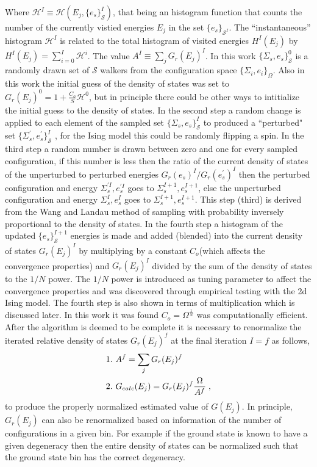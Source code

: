\documentclass[aps,pre,reprint,superscriptaddress,showkeys]{revtex4-1}
\begin{document}
Where  $\mathcal{H}^I \equiv \mathcal{H}(E_j,\{e_s\}_{\mathcal{S}}^I)$, that being an  histogram function that counts the number of the currently vistied  energies $E_j$ in the set $\{e_s\}_{\mathcal{S}^I}$. The ``instantaneous'' histogram $\mathcal{H}^I$ is related to the total histogram of visited energies $H^I(E_j)$ by $H^I(E_j) = \sum_{i=0}^{I}\mathcal{H}^i$. The value $A^I \equiv \sum_jG_r(E_j)^I$.  In this work $\{\Sigma_{s},e_s\}_{\mathcal{S}}^0$  is a randomly drawn set of $\mathcal{S}$ walkers from the configuration space $\{ \Sigma_i, e_i \}_\Omega $. Also in this work the initial guess of the density of states was set to $G_{r}(E_j)^0 = 1 +  \frac{C_o}{S}\mathcal{H}^0$, but in principle there could be other ways to intitialize the initial guess to the density of states. In the second step  a random change is applied to each element of the sampled set $\{\Sigma_{s},e_s\}_{\mathcal{S}}^I$ to produced a ``perturbed" set $ \{\Sigma_{s}^{'},e_s^{'}\}_{\mathcal{S}}^I$ , for the Ising model this could be randomly flipping a spin.  In the third step a random number is drawn between zero and one for every sampled configuration, if this number is less then the ratio of the current density of states of the unperturbed to perturbed energies $G_{r}(e_s)^{I}/G_{r}(e_s^{'})^{I}$ then the perturbed configuration and energy  $\Sigma_{s}^{'I},e_s^{'I}$  goes to $\Sigma_{s}^{I+1},e_s^{I+1}$,  else the unperturbed configuration and energy $\Sigma_{s}^{I},e_s^I$  goes to $\Sigma_{s}^{I+1},e_s^{I+1}$. This step (third) is derived from the Wang and Landau method of sampling with probability inversely proportional to the density of states.  In the fourth step a histogram of the updated $\{ e_s \}^{I+1}_{\mathcal{S}}$ energies is made and added (blended) into the current density of states $G_{r}(E_j)^I$   by multiplying  by a constant $C_{o}$(which affects the convergence properties) and   $G_{r}(E_j)^{I}$ divided by the sum of the density of states to the $1/N$ power. The $1/N$ power is introduced as tuning parameter to affect the convergence properties and was discovered through empirical testing with the 2d Ising model.  The fourth step is also shown in terms of multiplication which is discussed later. In this work it was found  $C_{o}=\Omega^{\frac{1}{N}}$ was computationally efficient. After the algorithm is deemed to be complete it is necessary to renormalize the iterated relative density of states $G_{r}(E_j)^f$ at the final iteration $I=f$ as follows, 
\begin{equation}
\begin{split}
&1. \hspace{0.125cm} A^f = \sum_jG_{r}(E_j)^f\\
&2. \hspace{0.125cm} G_{calc}(E_j) = G_{r}(E_j)^f \frac{\Omega}{A^f} \;,
\end{split}
\label{renormalize}
\end{equation}
to produce the properly normalized estimated value of $G(E_j)$. In principle, $G_{r}(E_j)$ can also be renormalized based on information of the number of configurations in a given bin. For example if the ground state is known to have a given degeneracy then the entire density of states can be normalized such that the ground state bin has the correct degeneracy. 
\end{document}
